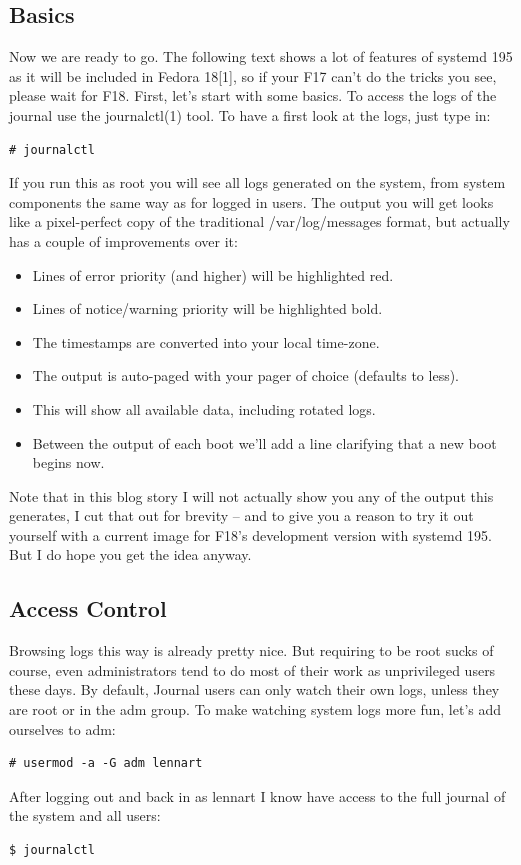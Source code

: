 \documentclass[titlepage]{article}
\begin{document}
\subsection{Basics}
Now we are ready to go. The following text shows a lot of features of systemd 195 as it will be included in Fedora 18[1], so if your F17 can't do the tricks you see, please wait for F18. First, let's start with some basics. To access the logs of the journal use the journalctl(1) tool. To have a first look at the logs, just type in:
\begin{lstlisting}
# journalctl
\end{lstlisting}
If you run this as root you will see all logs generated on the system, from system components the same way as for logged in users. The output you will get looks like a pixel-perfect copy of the traditional /var/log/messages format, but actually has a couple of improvements over it:
\begin{itemize}
\item Lines of error priority (and higher) will be highlighted red.
\item Lines of notice/warning priority will be highlighted bold.
\item The timestamps are converted into your local time-zone.
\item The output is auto-paged with your pager of choice (defaults to less).
\item This will show all available data, including rotated logs.
\item Between the output of each boot we'll add a line clarifying that a new boot begins now.
\end{itemize}
Note that in this blog story I will not actually show you any of the output this generates, I cut that out for brevity -- and to give you a reason to try it out yourself with a current image for F18's development version with systemd 195. But I do hope you get the idea anyway.
\subsection{Access Control}
Browsing logs this way is already pretty nice. But requiring to be root sucks of course, even administrators tend to do most of their work as unprivileged users these days. By default, Journal users can only watch their own logs, unless they are root or in the adm group. To make watching system logs more fun, let's add ourselves to adm:
\begin{lstlisting}
# usermod -a -G adm lennart
\end{lstlisting}
After logging out and back in as lennart I know have access to the full journal of the system and all users:
\begin{lstlisting}
$ journalctl
\end{lstlisting}
\end{document}
